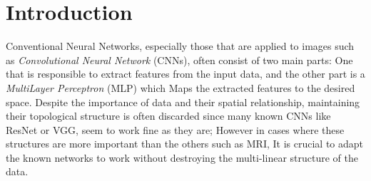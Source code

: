 \documentclass[runningheads]{llncs}
\begin{document}
\begin{abstract}

\textit{Fully Connected} (FC) layers are often used in many neural network architectures, such as \textit{Convolutional Neural Networks} (CNNs), which usually flatten the data before feeding it to the FC layers. Despite empirical success, some drawbacks include the changing of topological structure and the number of required parameters. Methods like the \textit{Tensor Contraction Layer} (TCL) and \textit{Tensor Regression Layer} (TRL) are capable candidates to use instead of FC layers, which preserve the multilinear structure of data as well as reduce the cost of execution. To exploit their capability even further, our method uses specific splitting approaches to generate thinner, higher dimensional tensors from the original data to reduce the cost by a greater factor while also maintaining accuracy. Our experiments on CIFAR10 and MNIST, applied to known models such as ResNet, VGG, and other typical CNNs, demonstrate our method's ability to reduce the cost compared to previous models and their TCL-TRL adaptation while also maintaining accuracy.
\end{abstract}


\section{Introduction}




Conventional Neural Networks, especially those that are applied to images such as \textit{Convolutional Neural Network} (CNNs), often consist of two main parts: One that is responsible to extract features from the input data, and the other part is a \textit{MultiLayer Perceptron} (MLP) which Maps the extracted features to the desired space. Despite the importance of data and their spatial relationship, maintaining their topological structure is often discarded since many known CNNs like ResNet or VGG, seem to work fine as they are; However in cases where these structures are more important than the others such as MRI, It is crucial to adapt the known networks to work without destroying the multi-linear structure of the data.
\end{document}
